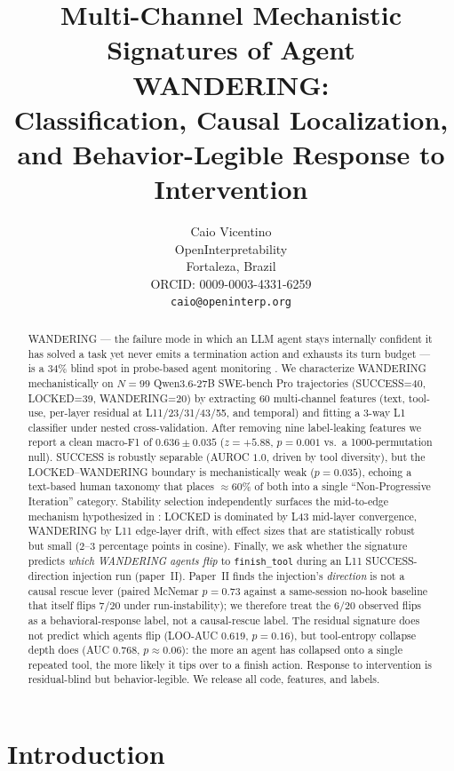 \documentclass[11pt]{article}
\title{Multi-Channel Mechanistic Signatures of Agent WANDERING:\\
Classification, Causal Localization, and Behavior-Legible Response to Intervention}
\author{%
  Caio Vicentino \\
  OpenInterpretability \\
  Fortaleza, Brazil \\
  ORCID: 0009-0003-4331-6259 \\
  \texttt{caio@openinterp.org}%
}
\date{}
\begin{document}
\maketitle

\begin{abstract}
WANDERING --- the failure mode in which an LLM agent stays internally confident it has solved a task yet never emits a termination action and exhausts its turn budget --- is a 34\% blind spot in probe-based agent monitoring \cite{toolentropy2026}. We characterize WANDERING mechanistically on $N{=}99$ Qwen3.6-27B SWE-bench Pro trajectories (SUCCESS=40, LOCKED=39, WANDERING=20) by extracting 60 multi-channel features (text, tool-use, per-layer residual at L11/23/31/43/55, and temporal) and fitting a 3-way L1 classifier under nested cross-validation. After removing nine label-leaking features we report a clean macro-F1 of $0.636\pm0.035$ ($z{=}{+}5.88$, $p{=}0.001$ vs.\ a 1000-permutation null). SUCCESS is robustly separable (AUROC $1.0$, driven by tool diversity), but the LOCKED--WANDERING boundary is mechanistically weak ($p{=}0.035$), echoing a text-based human taxonomy \cite{liu2026failures} that places $\approx$60\% of both into a single ``Non-Progressive Iteration'' category. Stability selection independently surfaces the mid-to-edge mechanism hypothesized in \cite{toolentropy2026}: LOCKED is dominated by L43 mid-layer convergence, WANDERING by L11 edge-layer drift, with effect sizes that are statistically robust but small ($2$--$3$ percentage points in cosine). Finally, we ask whether the signature predicts \emph{which WANDERING agents flip} to \texttt{finish\_tool} during an L11 SUCCESS-direction injection run (paper~II). Paper~II finds the injection's \emph{direction} is not a causal rescue lever (paired McNemar $p{=}0.73$ against a same-session no-hook baseline that itself flips $7/20$ under run-instability); we therefore treat the $6/20$ observed flips as a behavioral-response label, not a causal-rescue label. The residual signature does not predict which agents flip (LOO-AUC $0.619$, $p{=}0.16$), but tool-entropy collapse depth does (AUC $0.768$, $p\approx0.06$): the more an agent has collapsed onto a single repeated tool, the more likely it tips over to a finish action. Response to intervention is residual-blind but behavior-legible. We release all code, features, and labels.
\end{abstract}

\section{Introduction}
\end{document}
